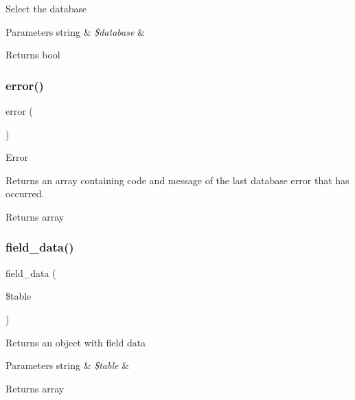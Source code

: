Select the database


\begin{DoxyParams}[1]{Parameters}
string & {\em \$database} & \\
\hline
\end{DoxyParams}
\begin{DoxyReturn}{Returns}
bool 
\end{DoxyReturn}
\mbox{\label{class_c_i___d_b__mysqli__driver_a43b8d30b879d4f09ceb059b02af2bc02}} 
\subsubsection{\texorpdfstring{error()}{error()}}
{\footnotesize\ttfamily error (\begin{DoxyParamCaption}{ }\end{DoxyParamCaption})}

Error

Returns an array containing code and message of the last database error that has occurred.

\begin{DoxyReturn}{Returns}
array 
\end{DoxyReturn}
\mbox{\label{class_c_i___d_b__mysqli__driver_a90355121e1ed009e0efdbd544ab56efa}} 
\subsubsection{\texorpdfstring{field\+\_\+data()}{field\_data()}}
{\footnotesize\ttfamily field\+\_\+data (\begin{DoxyParamCaption}\item[{}]{\$table }\end{DoxyParamCaption})}

Returns an object with field data


\begin{DoxyParams}[1]{Parameters}
string & {\em \$table} & \\
\hline
\end{DoxyParams}
\begin{DoxyReturn}{Returns}
array 
\end{DoxyReturn}
\mbox{\label{class_c_i___d_b__mysqli__driver_a933f2cde8dc7f87875e257d0a4902e99}} 
